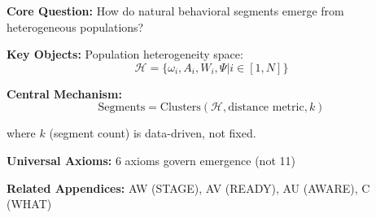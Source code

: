 
\begin{tcolorbox}[colback=blue!5!white, colframe=blue!75!black,
    title=Quick Reference: Segmentation Genesis]

\textbf{Core Question:} How do natural behavioral segments emerge from
heterogeneous populations?

\textbf{Key Objects:}
Population heterogeneity space:
\begin{equation}
\mathcal{H} = \{\omega_i, A_i, W_i, \Psi | i \in [1,N]\}
\end{equation}

\textbf{Central Mechanism:}
\begin{equation}
\text{Segments} = \text{Clusters}(\mathcal{H}, \text{distance metric}, k)
\end{equation}

where $k$ (segment count) is data-driven, not fixed.

\textbf{Universal Axioms:} 6 axioms govern emergence (not 11)

\textbf{Related Appendices:} AW (STAGE), AV (READY), AU (AWARE), C (WHAT)

\end{tcolorbox}


